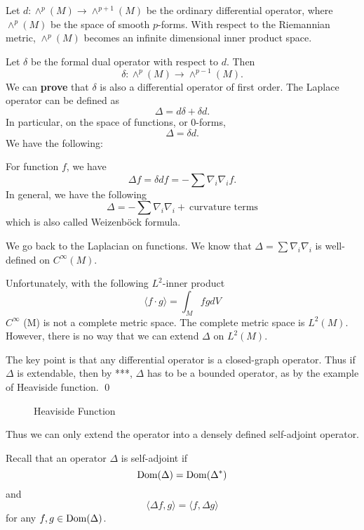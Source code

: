  Let $ d : \wedge ^p (M) \rightarrow  \wedge^{p+1} (M) $ be the ordinary differential operator, where $ \wedge ^p(M) $ be the space of smooth $p$-forms. With respect to the Riemannian metric,  $ \wedge^p(M)$ becomes an infinite dimensional inner product space.

Let $ \delta $ be the formal dual operator with respect to $d$. Then
%
\[\delta: \wedge ^p(M) \rightarrow   \wedge ^{p-1} (M). \]
%
We can {\bf prove} that $ \delta$ is also a differential operator of first order. The Laplace operator can be defined as 
%
\[ \Delta = d \delta + \delta d .\]
%
In particular, on the space of functions, or $0$-forms,
%
\[ \Delta = \delta d.\]
We have the following:

\begin{theorem} For function $f$, we have 
%
\[ \Delta f = \delta d f = - \sum \nabla _i\nabla_i f .\]
In general, we have the following 
%
\[ \Delta = - \sum \nabla _i \nabla _i +  \ \mbox{curvature terms}\]
%
which is also called Weizenb\"{o}ck formula.

We go back to the Laplacian on functions. We know that $ \Delta = \sum \nabla _i \nabla _ i $ is well-defined on 
$ C^\infty (M)$. 

Unfortunately, with the following $ L^2$-inner product 
%
\[ \langle f \cdot g \rangle = \int _M fg d V  \]
%
$C^\infty$ (M) is not a complete metric space. The complete metric space is $ L^2(M) $. However, there is no way that we can extend $ \Delta $ on $ L^2(M) $.
\end{theorem}

The key point is that any differential operator is a closed-graph operator. Thus if $ \Delta $ is extendable, then by ***, $ \Delta $ has to be a bounded operator, as by the example of Heaviside function.
\qed

\begin{figure}[h!]
\vspace{0.2in}
\caption{Heaviside Function}
\end{figure}

\vspace{0.5in}

Thus we can only extend the operator into a densely defined self-adjoint operator.

Recall that an operator $ \Delta $ is self-adjoint if 
%
\[ {\rm Dom} (\Delta) = {\rm Dom} ( \Delta ^\ast) \]
and 
\[ \langle \Delta f , g \rangle = \langle f, \Delta g \rangle \]
for any $ f, g \in {\rm Dom} (\Delta)$.

